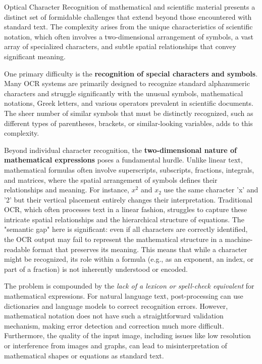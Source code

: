 Optical Character Recognition of mathematical and scientific material presents a distinct set of formidable challenges that extend beyond those encountered with standard text. The complexity arises from the unique characteristics of scientific notation, which often involves a two-dimensional arrangement of symbols, a vast array of specialized characters, and subtle spatial relationships that convey significant meaning.

One primary difficulty is the \textbf{recognition of special characters and symbols}. Many OCR systems are primarily designed to recognize standard alphanumeric characters and struggle significantly with the unusual symbols, mathematical notations, Greek letters, and various operators prevalent in scientific documents. \cite{DocuclipperLimitations} The sheer number of similar symbols that must be distinctly recognized, such as different types of parentheses, brackets, or similar-looking variables, adds to this complexity. \cite{ResearchGateMathSVM}

Beyond individual character recognition, the \textbf{two-dimensional nature of mathematical expressions} poses a fundamental hurdle. Unlike linear text, mathematical formulas often involve superscripts, subscripts, fractions, integrals, and matrices, where the spatial arrangement of symbols defines their relationships and meaning. \cite{WorldScientificMathOCR, ResearchGateMathSVM} For instance, $x^2$ and $x_2$ use the same character 'x' and '2' but their vertical placement entirely changes their interpretation. Traditional OCR, which often processes text in a linear fashion, struggles to capture these intricate spatial relationships and the hierarchical structure of equations. \cite{WorldScientificMathOCR} The "semantic gap" here is significant: even if all characters are correctly identified, the OCR output may fail to represent the mathematical structure in a machine-readable format that preserves its meaning. This means that while a character might be recognized, its role within a formula (e.g., as an exponent, an index, or part of a fraction) is not inherently understood or encoded.

The problem is compounded by the \emph{lack of a lexicon or spell-check equivalent} for mathematical expressions. \cite{ResearchGateMathSVM} For natural language text, post-processing can use dictionaries and language models to correct recognition errors. However, mathematical notation does not have such a straightforward validation mechanism, making error detection and correction much more difficult. \cite{ResearchGateMathSVM} Furthermore, the quality of the input image, including issues like low resolution or interference from images and graphs, can lead to misinterpretation of mathematical shapes or equations as standard text. \cite{DocuclipperLimitations}

